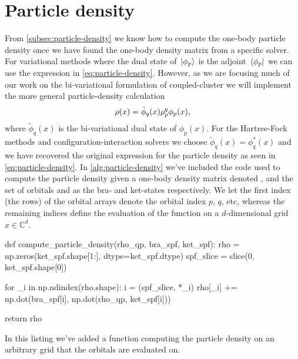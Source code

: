     \section{Particle density}
        \label{sec:particle-density}
        From \autoref{subsec:particle-density} we know how to compute the
        one-body particle density once we have found the one-body density matrix
        from a specific solver.
        For variational methods where the dual state of $\ket*{\phi_p}$ is the
        adjoint $\bra*{\phi_p}$ we can use the expression in
        \autoref{eq:particle-density}.
        However, as we are focusing much of our work on the bi-variational
        formulation of coupled-cluster we will implement the more general
        particle-density calculation
        \begin{align}
            \rho(x)
            = \tilde{\phi}_{q}(x)
            \rho^{q}_{p}
            \phi_p(x),
        \end{align}
        where $\tilde{\phi}_q(x)$ is the bi-variational dual state of
        $\phi_p(x)$.
        For the Hartree-Fock methods and configuration-interaction solvers we
        choose $\tilde{\phi}_q(x) = \phi^{*}_q(x)$ and we have recovered the
        original expression for the particle density as seen in
        \autoref{eq:particle-density}.
        In \autoref{alg:particle-density} we've included the code used to
        compute the particle density given a one-body density matrix denoted
        , and the set of orbitals  and 
        as the bra- and ket-states respectively.
        We let the first index (the rows) of the orbital arrays denote the
        orbital index $p$, $q$, etc, whereas the remaining indices define the
        evaluation of the function on a $d$-dimensional grid $x \in
        \mathbb{C}^{d}$.
        \begin{algorithm}
            \begin{python}
def compute_particle_density(rho_qp, bra_spf, ket_spf):
    rho = np.zeros(ket_spf.shape[1:], dtype=ket_spf.dtype)
    spf_slice = slice(0, ket_spf.shape[0])

    for _i in np.ndindex(rho.shape):
        i = (spf_slice, *_i)
        rho[_i] += np.dot(bra_spf[i], np.dot(rho_qp, ket_spf[i]))

    return rho
            \end{python}
            \caption{In this listing we've added a function computing the
            particle density on an arbitrary grid that the orbitals are
            evaluated on.}
            \label{alg:particle-density}
        \end{algorithm}

